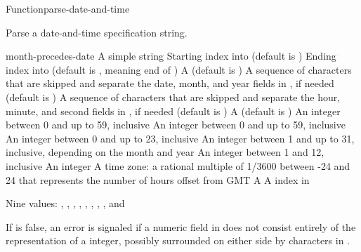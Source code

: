 \documentclass[10pt,twoside,english,pdftex]{article}
\begin{document}
\begin{functiondoc}{Function}{parse-date-and-time}{%
     
    }
% 

\fnsyntax

\fnpurpose Parse a date-and-time specification string.

\fnpackage {} 

\fnmodule {}

\fnargs
\begin{args}{month-precedes-date}
\arg[string] A simple string
\arg[start] Starting index into  (default is )
\arg[end] Ending index into  (default is \nil, meaning
end of )
 A  (default is \nil)
 A sequence of characters that are skipped and separate the
 date, month, and year fields in , if needed (default is 
 )
 A sequence of characters that are skipped and separate the
 hour, minute, and second fields in , if needed (default is 
 )
 A  (default is 
)
\arg[second] An integer between 0 and up to 59, inclusive
\arg[minute] An integer between 0 and up to 59, inclusive
\arg[hour] An integer between 0 and up to 23, inclusive
\arg[date] An integer between 1 and up to 31, inclusive, depending
  on the month and year
\arg[month] An integer between 1 and 12, inclusive
\arg[year] An integer
 A time zone: a rational multiple of 1/3600 between
 -24 and 24 that represents the number of hours offset from GMT
 A 
\arg[position] A index in 
\end{args}

\fnreturns Nine values: , , , ,
, , ,
, and 

\fnerrors
%
If  is false, an error is signaled if a numeric field in
 does not consist entirely of the representation of a integer,
possibly surrounded on either side by characters in .


\end{functiondoc}
\end{document}
